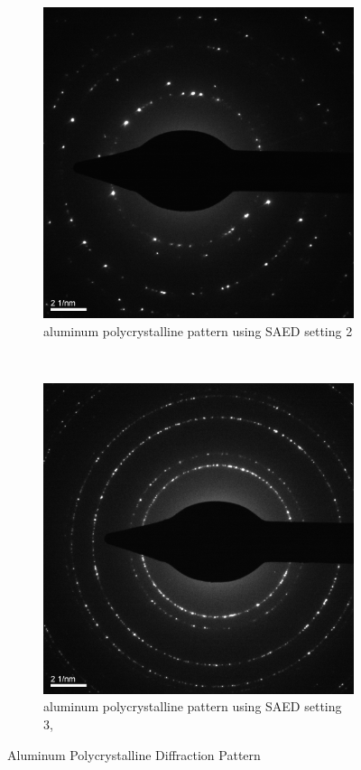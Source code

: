 \documentclass[12pt,a4paper]{article}
\begin{document}
\begin{figure}[htbp]
  \centering
    \begin{subfigure}[b]{0.45\textwidth}
    \includegraphics[width=\textwidth]{data/Image1 Al_Diff_SAED2.png}
    \caption{aluminum polycrystalline pattern using SAED setting 2}
    \label{fig:al2}
  \end{subfigure}%
  ~
  \begin{subfigure}[b]{0.45\textwidth}
    \includegraphics[width=\textwidth]{data/Image2Al_Diff_SAED3.png}
    \caption{aluminum polycrystalline pattern using SAED setting 3, }
    \label{fig:al3}
  \end{subfigure}
  \caption{Aluminum Polycrystalline Diffraction Pattern}
  \label{fig:aluminum}
\end{figure}
\end{document}
